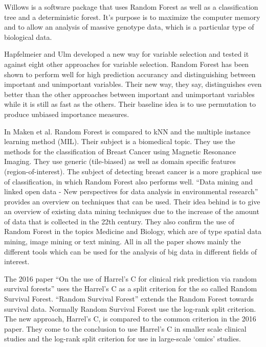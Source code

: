 \documentclass{sig-alternate-05-2015}
\begin{document}
Willows \cite{zhang2009willows} is a software package that uses Random Forest as well as a classification tree and a deterministic forest. It's purpose is to maximize the computer memory and to allow an analysis of massive genotype data, which is a particular type of biological data. 

Hapfelmeier and Ulm \cite{hapfelmeier2013new} developed a new way for variable selection and tested it against eight other approaches for variable selection. Random Forest has been shown to perform well for high prediction accurancy and distinguishing between important and unimportant variables. Their new way, they say, distinguishes even better than the other approaches between important and unimportant variables while it is still as fast as the others. Their baseline idea is to use permutation to produce unbiased importance measures.

In Maken et al. \cite{maken2014multiple} Random Forest is compared to kNN and the multiple instance learning method (MIL). Their subject is a biomedical topic. They use the methods for the classification of Breast Cancer using Magnetic Resonance Imaging. They use generic (tile-biased) as well as domain specific features (region-of-interest). The subject of detecting breast cancer is a more graphical use of classification, in which Random Forest also performs well.
``Data mining and linked open data - New perspectives for data analysis in environmental research'' \cite{lausch2015data} provides an overview on techniques that can be used. Their idea behind is to give an overview of existing data mining techniques due to the increase of the amount of data that is collected in the 22th century. They also confirm the use of Random Forest in the topics Medicine and Biology, which are of type spatial data mining, image mining or text mining. All in all the paper shows mainly the different tools which can be used for the analysis of big data in different fields of interest.

The 2016 paper ``On the use of Harrel's C for clinical risk prediction via random survival forests'' \cite{Schmid2016450} uses the Harrel's C as a split criterion for the so called Random Survival Forest. ``Random Survival Forest'' \cite{ishwaran2008random} extends the Random Forest towards survival data. Normally Random Survival Forest use the log-rank split criterion. The new approach, Harrel's C, is compared to the common criterion in the 2016 paper. They come to the conclusion to use Harrel's C in smaller scale clinical studies and the log-rank split criterion for use in large-scale `omics' studies.
\end{document}
